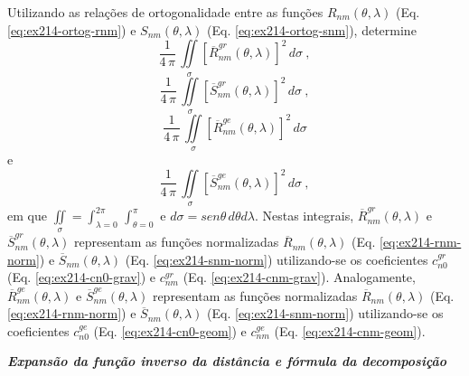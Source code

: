 \documentclass[10pt,a4paper,fleqn]{article}
\begin{document}
Utilizando as relaç\~{o}es de ortogonalidade entre as funç\~{o}es $R_{nm}(\theta, \lambda)$ 
(Eq. \ref{eq:ex214-ortog-rnm}) e $S_{nm}(\theta, \lambda)$ (Eq. \ref{eq:ex214-ortog-snm}),
determine 
$$\dfrac{1}{4 \, \pi} \, \iint \limits_{\sigma} \left[ \overline{R}_{nm}^{gr} (\theta, \lambda)
\right]^{2} \, d \sigma \: ,$$ 
$$\dfrac{1}{4 \, \pi} \, \iint \limits_{\sigma} \left[ \overline{S}_{nm}^{gr} (\theta, \lambda)
\right]^{2} \, d \sigma \: ,$$ 
$$\dfrac{1}{4 \, \pi} \, \iint \limits_{\sigma} \left[ \overline{R}_{nm}^{ge} (\theta, \lambda)
\right]^{2} \, d \sigma$$ 
e
$$\dfrac{1}{4 \, \pi} \, \iint \limits_{\sigma} \left[ \overline{S}_{nm}^{ge}  (\theta, \lambda)
\right]^{2} \, d \sigma \: ,$$
em que $\iint \limits_{\sigma} = \int_{\lambda = 0}^{2\pi} \, \int_{\theta = 0}^{\pi}$ e $d \sigma 
= sen\theta \, d\theta d\lambda$. Nestas integrais, $\overline{R}_{nm}^{gr} (\theta, \lambda)$ e 
$\overline{S}_{nm}^{gr} (\theta, \lambda)$ representam as funç\~{o}es normalizadas $\overline{R}_{nm}
(\theta, \lambda)$ (Eq. \ref{eq:ex214-rnm-norm}) e $\overline{S}_{nm} (\theta, \lambda)$ 
(Eq. \ref{eq:ex214-snm-norm}) utilizando-se os coeficientes $c_{n0}^{gr}$ (Eq. \ref{eq:ex214-cn0-grav}) 
e $c_{nm}^{gr}$ (Eq. \ref{eq:ex214-cnm-grav}). Analogamente, $\overline{R}_{nm}^{ge} (\theta, \lambda)$ 
e $\overline{S}_{nm}^{ge} (\theta, \lambda)$ representam as funç\~{o}es normalizadas 
$\overline{R}_{nm} (\theta, \lambda)$ (Eq. \ref{eq:ex214-rnm-norm}) e $\overline{S}_{nm} (\theta, \lambda)$ 
(Eq. \ref{eq:ex214-snm-norm}) utilizando-se os coeficientes $c_{n0}^{ge}$ 
(Eq. \ref{eq:ex214-cn0-geom}) e $c_{nm}^{ge}$ (Eq. \ref{eq:ex214-cnm-geom}).

\begin{flushleft}
\dotfill
\end{flushleft}

\bigskip
\bigskip

\begin{flushleft}
\emph{\textbf{Expans\~{a}o da funç\~{a}o inverso da dist\^{a}ncia e f\'{o}rmula da decomposiç\~{a}o}}
\end{flushleft}
\end{document}
